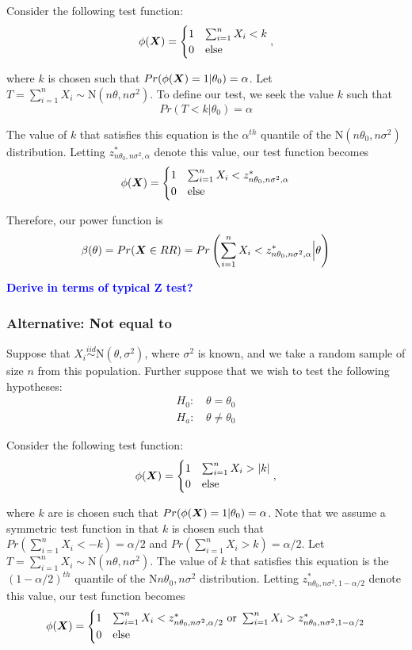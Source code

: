\documentclass[]{article}
\newcommand{\bfX}{\mbox{\boldmath $X$}}
\begin{document}
Consider the following test function:
\[
\phi(\bfX) = \begin{cases}
1 & \sum_{i=1}^n X_i < k \\
0 & \text{else}
\end{cases},
\]

where $k$ is chosen such that $Pr(\phi(\bfX) = 1|\theta_0) = \alpha$. Let $T = \sum_{i=1}^{n} X_i \sim \text{N}(n\theta, n\sigma^2)$. To define our test, we seek the value $k$ such that 
\[
Pr(T < k | \theta_0) = \alpha
\]

The value of $k$ that satisfies this equation is the $\alpha^{th}$ quantile of the $\text{N}(n\theta_0, n\sigma^2)$ distribution. Letting $z^*_{n\theta_0, n\sigma^2, \alpha}$ denote this value, our test function becomes
\[
\phi(\bfX) = \begin{cases}
1 & \sum_{i=1}^n X_i < z^*_{n\theta_0, n\sigma^2, \alpha} \\
0 & \text{else}
\end{cases}
\]

Therefore, our power function is
\[
\beta(\theta) = Pr(\bfX \in RR) = Pr\left(\sum_{i=1}^n X_i < z^*_{n\theta_0, n\sigma^2, \alpha} \Big| \theta\right) 
\]

\textbf{\textcolor{blue}{Derive in terms of typical Z test?}}

\subsubsection{Alternative: Not equal to}

Suppose that $X_i \stackrel{iid}{\sim} \text{N}(\theta, \sigma^2)$, where $\sigma^2$ is known, and we take a random sample of size $n$ from this population. Further suppose that we wish to test the following hypotheses:
\[
\begin{split}
\text{$H_0$: }& \theta = \theta_0 \\
\text{$H_a$: }& \theta \neq \theta_0
\end{split}
\]

Consider the following test function:
\[
\phi(\bfX) = \begin{cases}
1 & \sum_{i=1}^n X_i > |k| \\
0 & \text{else}
\end{cases},
\]

where $k$ are is chosen such that $Pr(\phi(\bfX) = 1|\theta_0) = \alpha$. Note that we assume a symmetric test function in that $k$ is chosen such that $Pr(\sum_{i=1}^n X_i < -k) = \alpha/2$ and $Pr(\sum_{i=1}^n X_i > k) = \alpha/2$. Let $T = \sum_{i=1}^n X_i \sim \text{N}(n\theta, n\sigma^2)$. The value of $k$ that satisfies this equation is the $(1-\alpha/2)^{th}$ quantile of the $\text{N}{n\theta_0, n\sigma^2}$ distribution. Letting $z^*_{n\theta_0, n\sigma^2, 1-\alpha/2}$ denote this value, our test function becomes
\[
\phi(\bfX) = \begin{cases}
1 & \sum_{i=1}^n X_i < z^*_{n\theta_0, n\sigma^2, \alpha/2} \text{ or } \sum_{i=1}^n X_i > z^*_{n\theta_0, n\sigma^2, 1-\alpha/2} \\
0 & \text{else}
\end{cases}
\]
\end{document}
